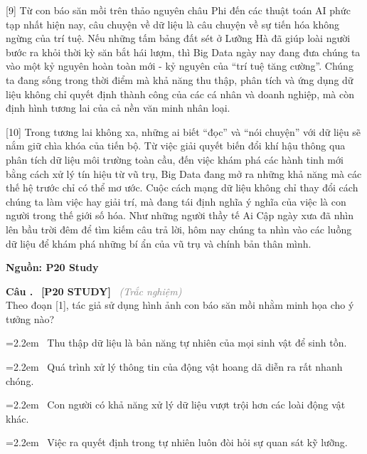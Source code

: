 \documentclass[12pt,a4paper,twoside]{article}
\newcounter{qcounter}
\newcommand{\question}[2][]{%
    \stepcounter{qcounter}%
    \par\vspace{5pt}%
    \noindent\textcolor{primaryBlue}{\textbf{Câu \theqcounter.}}~%
    \textcolor{secondaryBlue}{\small\textbf{[P20 STUDY]}}~%
    \if\relax\detokenize{#1}\relax\else\textcolor{gray}{\small\textit{(#1)}}~\fi\\[1pt]
    \noindent #2%
}
\newcommand{\choiceitem}[2]{%
    \tikz[baseline=-0.5ex]{
        \node[draw=primaryBlue, circle, minimum size=1.5em, inner sep=0pt, thick] {\textbf{#1}};
    }~#2%
}
\newenvironment{readingpassage}[1][]{%
    \begin{tcolorbox}[enhanced, colback=grayLight, colframe=secondaryBlue,
        coltitle=textDark, fonttitle=\bfseries, title={#1},
        rounded corners, arc=3mm, boxrule=1pt,
        left=15pt, right=15pt, top=10pt, bottom=10pt,
        breakable, before skip=10pt, after skip=10pt, drop fuzzy shadow]
    \setstretch{1.3}
}{\end{tcolorbox}}
\begin{document}
\begin{readingpassage}[]
[9] Từ con báo săn mồi trên thảo nguyên châu Phi đến các thuật toán AI phức tạp nhất hiện nay, câu chuyện về dữ liệu là câu chuyện về sự tiến hóa không ngừng của trí tuệ. Nếu những tấm bảng đất sét ở Lưỡng Hà đã giúp loài người bước ra khỏi thời kỳ săn bắt hái lượm, thì Big Data ngày nay đang đưa chúng ta vào một kỷ nguyên hoàn toàn mới - kỷ nguyên của ``trí tuệ tăng cường''. Chúng ta đang sống trong thời điểm mà khả năng thu thập, phân tích và ứng dụng dữ liệu không chỉ quyết định thành công của các cá nhân và doanh nghiệp, mà còn định hình tương lai của cả nền văn minh nhân loại.

[10] Trong tương lai không xa, những ai biết ``đọc'' và ``nói chuyện'' với dữ liệu sẽ nắm giữ chìa khóa của tiến bộ. Từ việc giải quyết biến đổi khí hậu thông qua phân tích dữ liệu môi trường toàn cầu, đến việc khám phá các hành tinh mới bằng cách xử lý tín hiệu từ vũ trụ, Big Data đang mở ra những khả năng mà các thế hệ trước chỉ có thể mơ ước. Cuộc cách mạng dữ liệu không chỉ thay đổi cách chúng ta làm việc hay giải trí, mà đang tái định nghĩa ý nghĩa của việc là con người trong thế giới số hóa. Như những người thầy tế Ai Cập ngày xưa đã nhìn lên bầu trời đêm để tìm kiếm câu trả lời, hôm nay chúng ta nhìn vào các luồng dữ liệu để khám phá những bí ẩn của vũ trụ và chính bản thân mình.

\hfill \textbf{Nguồn: P20 Study}
\end{readingpassage}

\setcounter{qcounter}{0}
\question[Trắc nghiệm]{Theo đoạn [1], tác giả sử dụng hình ảnh con báo săn mồi nhằm minh họa cho ý tưởng nào?}
\par\vspace{4pt}
\noindent\hangindent=2.2em\choiceitem{A}{Thu thập dữ liệu là bản năng tự nhiên của mọi sinh vật để sinh tồn.}\par\vspace{4pt}
\noindent\hangindent=2.2em\choiceitem{B}{Quá trình xử lý thông tin của động vật hoang dã diễn ra rất nhanh chóng.}\par\vspace{4pt}
\noindent\hangindent=2.2em\choiceitem{C}{Con người có khả năng xử lý dữ liệu vượt trội hơn các loài động vật khác.}\par\vspace{4pt}
\noindent\hangindent=2.2em\choiceitem{D}{Việc ra quyết định trong tự nhiên luôn đòi hỏi sự quan sát kỹ lưỡng.}\par\vspace{4pt}
\end{document}
